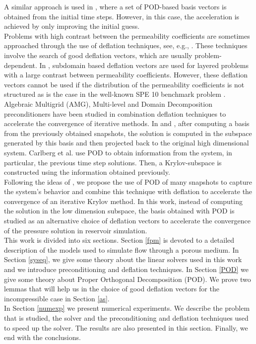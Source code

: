 \documentclass[12pt]{article}
\numberwithin{equation}{section}
\begin{document}
A similar approach is used in \cite{Mark06}, where a set of POD-based 
basis vectors is obtained from the initial time steps. However, in this case, the acceleration is 
achieved by only improving the initial guess.\\
Problems with high contrast between the permeability coefficients are sometimes approached through the 
use of deflation techniques, see, e.g., \cite{Vuik99}. These techniques involve the search 
of good deflation vectors, which are usually problem-dependent. In \cite{Vuik99}, subdomain based deflation 
vectors are used for layered problems with a large contrast between permeability coefficients. However, 
these deflation vectors cannot be used if the distribution of the permeability coefficients  is not 
structured as is the case in the well-known SPE 10 benchmark problem \cite{Christie01}.\\
Algebraic Multigrid (AMG)\cite{Klie07}, Multi-level and Domain Decomposition \cite{Tang09} preconditioners have been studied in combination deflation techniques to accelerate the convergence of iterative methods.
In \cite{Astrid11,Mark06} and \cite{Pasetto16}, after computing a basis from the 
previously obtained snapshots, the solution is computed in the subspace generated by this basis and then projected 
back to the original high dimensional system. Carlberg et al. \cite{Carlberg15} use POD to obtain information 
from the system, in particular, the previous time step solutions. Then, a Krylov-subspace is constructed using the 
information obtained previously.\\
Following the ideas of \cite{Astrid11,Mark06,Pasetto16,Carlberg15}, we propose the use of POD of many snapshots 
to capture the system's behavior and combine this technique with deflation to accelerate the convergence of 
an iterative Krylov method.
In this work, instead of computing the solution in the low dimension subspace, the basis obtained with POD is 
studied as an alternative choice of deflation vectors 
to accelerate the convergence of the pressure solution in reservoir simulation.  \\
This work is divided into six sections. 
  Section \ref{fpm} is devoted to a detailed description of the models used to simulate flow through a porous medium. In Section \ref{syseq}, we give some theory about the linear solvers used in this work and we introduce preconditioning 
  and deflation techniques. 
  In Section \ref{POD} we give some theory about Proper Orthogonal Decomposition (POD). We prove two lemmas that will help us in the choice of good deflation vectors for the 
  incompressible case in Section \ref{as}.\\
 In Section \ref{numexp} we present numerical experiments. We describe the problem that is studied, the solver and the preconditioning and deflation techniques used to speed up the solver. The results are also presented
 in this section.
 Finally, we end with the conclusions.
 
\end{document}
